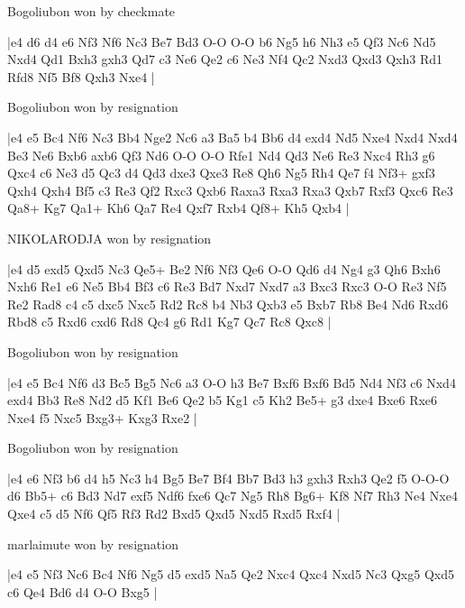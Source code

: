 \showboard

Bogoliubon won by checkmate

\makegametitle
|e4 d6 d4 e6 Nf3 Nf6 Nc3 Be7 Bd3 O-O O-O b6 Ng5 h6 Nh3 e5 Qf3 Nc6 Nd5 Nxd4 Qd1 Bxh3 gxh3 Qd7 c3 Ne6 Qe2 c6 Ne3 Nf4 Qc2 Nxd3 Qxd3 Qxh3 Rd1 Rfd8 Nf5 Bf8 Qxh3 Nxe4  |

\showboard

Bogoliubon won by resignation

\makegametitle
|e4 e5 Bc4 Nf6 Nc3 Bb4 Nge2 Nc6 a3 Ba5 b4 Bb6 d4 exd4 Nd5 Nxe4 Nxd4 Nxd4 Be3 Ne6 Bxb6 axb6 Qf3 Nd6 O-O O-O Rfe1 Nd4 Qd3 Ne6 Re3 Nxc4 Rh3 g6 Qxc4 c6 Ne3 d5 Qc3 d4 Qd3 dxe3 Qxe3 Re8 Qh6 Ng5 Rh4 Qe7 f4 Nf3+ gxf3 Qxh4 Qxh4 Bf5 c3 Re3 Qf2 Rxc3 Qxb6 Raxa3 Rxa3 Rxa3 Qxb7 Rxf3 Qxc6 Re3 Qa8+ Kg7 Qa1+ Kh6 Qa7 Re4 Qxf7 Rxb4 Qf8+ Kh5 Qxb4  |

\showboard

NIKOLARODJA won by resignation

\makegametitle
|e4 d5 exd5 Qxd5 Nc3 Qe5+ Be2 Nf6 Nf3 Qe6 O-O Qd6 d4 Ng4 g3 Qh6 Bxh6 Nxh6 Re1 e6 Ne5 Bb4 Bf3 c6 Re3 Bd7 Nxd7 Nxd7 a3 Bxc3 Rxc3 O-O Re3 Nf5 Re2 Rad8 c4 c5 dxc5 Nxc5 Rd2 Rc8 b4 Nb3 Qxb3 e5 Bxb7 Rb8 Be4 Nd6 Rxd6 Rbd8 c5 Rxd6 cxd6 Rd8 Qc4 g6 Rd1 Kg7 Qc7 Rc8 Qxc8  |

\showboard

Bogoliubon won by resignation

\makegametitle
|e4 e5 Bc4 Nf6 d3 Bc5 Bg5 Nc6 a3 O-O h3 Be7 Bxf6 Bxf6 Bd5 Nd4 Nf3 c6 Nxd4 exd4 Bb3 Re8 Nd2 d5 Kf1 Be6 Qe2 b5 Kg1 c5 Kh2 Be5+ g3 dxe4 Bxe6 Rxe6 Nxe4 f5 Nxc5 Bxg3+ Kxg3 Rxe2  |

\showboard

Bogoliubon won by resignation

\makegametitle
|e4 e6 Nf3 b6 d4 h5 Nc3 h4 Bg5 Be7 Bf4 Bb7 Bd3 h3 gxh3 Rxh3 Qe2 f5 O-O-O d6 Bb5+ c6 Bd3 Nd7 exf5 Ndf6 fxe6 Qc7 Ng5 Rh8 Bg6+ Kf8 Nf7 Rh3 Ne4 Nxe4 Qxe4 c5 d5 Nf6 Qf5 Rf3 Rd2 Bxd5 Qxd5 Nxd5 Rxd5 Rxf4  |

\showboard

marlaimute won by resignation

\makegametitle
|e4 e5 Nf3 Nc6 Bc4 Nf6 Ng5 d5 exd5 Na5 Qe2 Nxc4 Qxc4 Nxd5 Nc3 Qxg5 Qxd5 c6 Qe4 Bd6 d4 O-O Bxg5  |


